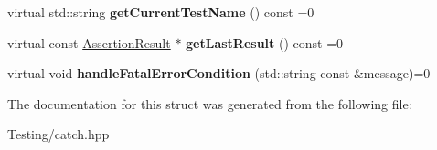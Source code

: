 \begin{DoxyCompactItemize}
\item 
\hypertarget{struct_catch_1_1_i_result_capture_aea1617f4a84cc648246aa3ed6918b5bf}{virtual std\-::string {\bfseries get\-Current\-Test\-Name} () const =0}\label{struct_catch_1_1_i_result_capture_aea1617f4a84cc648246aa3ed6918b5bf}

\item 
\hypertarget{struct_catch_1_1_i_result_capture_ab18872c89fab97405a56e9c6a4919736}{virtual const \hyperlink{class_catch_1_1_assertion_result}{Assertion\-Result} $\ast$ {\bfseries get\-Last\-Result} () const =0}\label{struct_catch_1_1_i_result_capture_ab18872c89fab97405a56e9c6a4919736}

\item 
\hypertarget{struct_catch_1_1_i_result_capture_a7d995222301e6605f26549726b30c3ee}{virtual void {\bfseries handle\-Fatal\-Error\-Condition} (std\-::string const \&message)=0}\label{struct_catch_1_1_i_result_capture_a7d995222301e6605f26549726b30c3ee}

\end{DoxyCompactItemize}


The documentation for this struct was generated from the following file\-:\begin{DoxyCompactItemize}
\item 
Testing/catch.\-hpp\end{DoxyCompactItemize}
